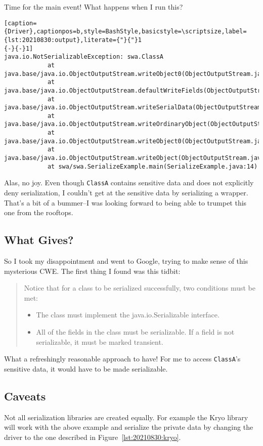 Time for the main event! What happens when I run this?
\begin{lstlisting}[caption={Driver},captionpos=b,style=BashStyle,basicstyle=\scriptsize,label={lst:20210830:output},literate={"}{"}1
{-}{-}1]
java.io.NotSerializableException: swa.ClassA
            at java.base/java.io.ObjectOutputStream.writeObject0(ObjectOutputStream.java:1192)
            at java.base/java.io.ObjectOutputStream.defaultWriteFields(ObjectOutputStream.java:1577)
            at java.base/java.io.ObjectOutputStream.writeSerialData(ObjectOutputStream.java:1534)
            at java.base/java.io.ObjectOutputStream.writeOrdinaryObject(ObjectOutputStream.java:1443)
            at java.base/java.io.ObjectOutputStream.writeObject0(ObjectOutputStream.java:1186)
            at java.base/java.io.ObjectOutputStream.writeObject(ObjectOutputStream.java:352)
            at swa/swa.SerializeExample.main(SerializeExample.java:14)
\end{lstlisting}

Alas, no joy. Even though \texttt{ClassA} contains sensitive data and does not explicitly deny serialization, I couldn't get at the sensitive data by serializing a wrapper. That's a bit of a bummer--I was looking forward to being able to trumpet this one from the rooftops.

\subsection{What Gives?}
So I took my disappointment and went to Google, trying to make sense of this mysterious CWE. The first thing I found was this tidbit:
\begin{quote}
	Notice that for a class to be serialized successfully, two conditions must be met:
	\begin{itemize}
		\item The class must implement the java.io.Serializable interface.
		\item All of the fields in the class must be serializable. If a field is not serializable, it must be marked transient.
	\end{itemize}\autocite{20210830:javaserialization}
\end{quote}

What a refreshingly reasonable approach to have! For me to access \texttt{ClassA}'s sensitive data, it would have to be made serializable.

\subsection{Caveats}
Not all serialization libraries are created equally. For example the Kryo library will work with the above example and serialize the private data by changing the driver to the one described in Figure~\ref{lst:20210830:kryo}.\autocite{20210830:kryo}

